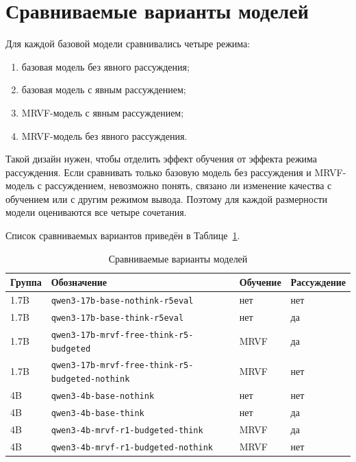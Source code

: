 \section{Сравниваемые варианты моделей}

Для каждой базовой модели сравнивались четыре режима:
\begin{enumerate}
    \item базовая модель без явного рассуждения;
    \item базовая модель с явным рассуждением;
    \item MRVF-модель с явным рассуждением;
    \item MRVF-модель без явного рассуждения.
\end{enumerate}

Такой дизайн нужен, чтобы отделить эффект обучения от эффекта режима рассуждения. Если сравнивать только базовую модель без рассуждения и MRVF-модель с рассуждением, невозможно понять, связано ли изменение качества с обучением или с другим режимом вывода. Поэтому для каждой размерности модели оцениваются все четыре сочетания.

Список сравниваемых вариантов приведён в Таблице~\ref{tab:generation-modes}.

\begin{table}[h]
    \centering
    \caption{Сравниваемые варианты моделей}
    \label{tab:generation-modes}
    \begin{tabular}{llll}
        \hline
        Группа & Обозначение                                            & Обучение & Рассуждение \\
        \hline
        1.7B   & \texttt{qwen3-17b-base-nothink-r5eval}                 & нет      & нет         \\
        1.7B   & \texttt{qwen3-17b-base-think-r5eval}                   & нет      & да          \\
        1.7B   & \texttt{qwen3-17b-mrvf-free-think-r5-budgeted}         & MRVF     & да          \\
        1.7B   & \texttt{qwen3-17b-mrvf-free-think-r5-budgeted-nothink} & MRVF     & нет         \\
        4B     & \texttt{qwen3-4b-base-nothink}                         & нет      & нет         \\
        4B     & \texttt{qwen3-4b-base-think}                           & нет      & да          \\
        4B     & \texttt{qwen3-4b-mrvf-r1-budgeted-think}               & MRVF     & да          \\
        4B     & \texttt{qwen3-4b-mrvf-r1-budgeted-nothink}             & MRVF     & нет         \\
        \hline
    \end{tabular}
\end{table}

